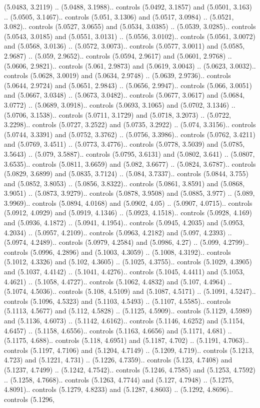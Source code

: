 (5.0483, 3.2119) .. (5.0488, 3.1988).. controls (5.0492, 3.1857) and (5.0501, 3.163) .. (5.0505, 3.1467).. controls (5.051, 3.1306) and (5.0517, 3.0984) .. (5.0521, 3.082).. controls (5.0527, 3.0655) and (5.0534, 3.0385) .. (5.0539, 3.0285).. controls (5.0543, 3.0185) and (5.0551, 3.0131) .. (5.0556, 3.0102).. controls (5.0561, 3.0072) and (5.0568, 3.0136) .. (5.0572, 3.0073).. controls (5.0577, 3.0011) and (5.0585, 2.9687) .. (5.059, 2.9652).. controls (5.0594, 2.9617) and (5.0601, 2.9768) .. (5.0606, 2.9821).. controls (5.061, 2.9873) and (5.0619, 3.0043) .. (5.0623, 3.0032).. controls (5.0628, 3.0019) and (5.0634, 2.9748) .. (5.0639, 2.9736).. controls (5.0644, 2.9724) and (5.0651, 2.9843) .. (5.0656, 2.9947).. controls (5.066, 3.0051) and (5.0667, 3.0348) .. (5.0673, 3.0482).. controls (5.0677, 3.0617) and (5.0684, 3.0772) .. (5.0689, 3.0918).. controls (5.0693, 3.1065) and (5.0702, 3.1346) .. (5.0706, 3.1538).. controls (5.0711, 3.1729) and (5.0718, 3.2073) .. (5.0722, 3.2298).. controls (5.0727, 3.2522) and (5.0735, 3.2922) .. (5.074, 3.3156).. controls (5.0744, 3.3391) and (5.0752, 3.3762) .. (5.0756, 3.3986).. controls (5.0762, 3.4211) and (5.0769, 3.4511) .. (5.0773, 3.4776).. controls (5.0778, 3.5039) and (5.0785, 3.5643) .. (5.079, 3.5887).. controls (5.0795, 3.6131) and (5.0802, 3.641) .. (5.0807, 3.6535).. controls (5.0811, 3.6659) and (5.082, 3.6677) .. (5.0824, 3.6787).. controls (5.0829, 3.6899) and (5.0835, 3.7124) .. (5.084, 3.7337).. controls (5.0844, 3.755) and (5.0852, 3.8053) .. (5.0856, 3.8322).. controls (5.0861, 3.8591) and (5.0868, 3.9051) .. (5.0873, 3.9279).. controls (5.0878, 3.9508) and (5.0885, 3.977) .. (5.089, 3.9969).. controls (5.0894, 4.0168) and (5.0902, 4.05) .. (5.0907, 4.0715).. controls (5.0912, 4.0929) and (5.0919, 4.1346) .. (5.0923, 4.1518).. controls (5.0928, 4.169) and (5.0936, 4.1872) .. (5.0941, 4.1954).. controls (5.0945, 4.2035) and (5.0953, 4.2034) .. (5.0957, 4.2109).. controls (5.0963, 4.2182) and (5.097, 4.2393) .. (5.0974, 4.2489).. controls (5.0979, 4.2584) and (5.0986, 4.27) .. (5.099, 4.2799).. controls (5.0996, 4.2896) and (5.1003, 4.3059) .. (5.1008, 4.3192).. controls (5.1012, 4.3326) and (5.102, 4.3605) .. (5.1025, 4.3755).. controls (5.1029, 4.3905) and (5.1037, 4.4142) .. (5.1041, 4.4276).. controls (5.1045, 4.4411) and (5.1053, 4.4621) .. (5.1058, 4.4727).. controls (5.1062, 4.4832) and (5.107, 4.4964) .. (5.1074, 4.5036).. controls (5.108, 4.5109) and (5.1087, 4.5171) .. (5.1091, 4.5247).. controls (5.1096, 4.5323) and (5.1103, 4.5493) .. (5.1107, 4.5585).. controls (5.1113, 4.5677) and (5.112, 4.5828) .. (5.1125, 4.5909).. controls (5.1129, 4.5989) and (5.1136, 4.6073) .. (5.1142, 4.6162).. controls (5.1146, 4.6252) and (5.1154, 4.6457) .. (5.1158, 4.6556).. controls (5.1163, 4.6656) and (5.1171, 4.681) .. (5.1175, 4.688).. controls (5.118, 4.6951) and (5.1187, 4.702) .. (5.1191, 4.7063).. controls (5.1197, 4.7106) and (5.1204, 4.7149) .. (5.1209, 4.719).. controls (5.1213, 4.723) and (5.1221, 4.731) .. (5.1226, 4.7359).. controls (5.123, 4.7408) and (5.1237, 4.7499) .. (5.1242, 4.7542).. controls (5.1246, 4.7585) and (5.1253, 4.7592) .. (5.1258, 4.7668).. controls (5.1263, 4.7744) and (5.127, 4.7948) .. (5.1275, 4.8091).. controls (5.1279, 4.8233) and (5.1287, 4.8603) .. (5.1292, 4.8696).. controls (5.1296, 